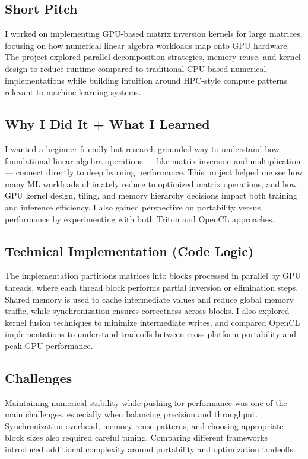 \documentclass[11pt]{article}
\begin{document}
\subsection{Short Pitch}
I worked on implementing GPU-based matrix inversion kernels for large matrices, focusing on how numerical linear algebra workloads map onto GPU hardware. The project explored parallel decomposition strategies, memory reuse, and kernel design to reduce runtime compared to traditional CPU-based numerical implementations while building intuition around HPC-style compute patterns relevant to machine learning systems.

\subsection{Why I Did It + What I Learned}
I wanted a beginner-friendly but research-grounded way to understand how foundational linear algebra operations — like matrix inversion and multiplication — connect directly to deep learning performance. This project helped me see how many ML workloads ultimately reduce to optimized matrix operations, and how GPU kernel design, tiling, and memory hierarchy decisions impact both training and inference efficiency. I also gained perspective on portability versus performance by experimenting with both Triton and OpenCL approaches.

\subsection{Technical Implementation (Code Logic)}
The implementation partitions matrices into blocks processed in parallel by GPU threads, where each thread block performs partial inversion or elimination steps. Shared memory is used to cache intermediate values and reduce global memory traffic, while synchronization ensures correctness across blocks. I also explored kernel fusion techniques to minimize intermediate writes, and compared OpenCL implementations to understand tradeoffs between cross-platform portability and peak GPU performance.

\subsection{Challenges}
Maintaining numerical stability while pushing for performance was one of the main challenges, especially when balancing precision and throughput. Synchronization overhead, memory reuse patterns, and choosing appropriate block sizes also required careful tuning. Comparing different frameworks introduced additional complexity around portability and optimization tradeoffs.
\end{document}

